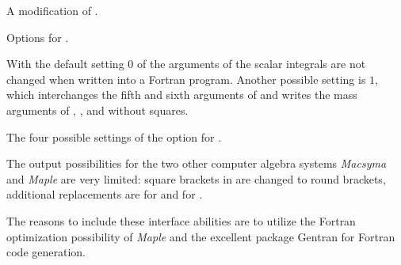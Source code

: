  {A modification of .}

 {Options for .} 

With the default setting $0$ of  the arguments of the 
scalar integrals are not changed when written into a Fortran program.
Another possible setting is $1$, which  interchanges the fifth and sixth arguments
of  and writes the mass arguments of , ,  and 
 without squares.

 {The four possible settings of the option  for .}

The output possibilities for the two other computer algebra systems 
{\it Macsyma} and {\it Maple} are very limited: square brackets in 
\mma are changed to round brackets,  additional replacements are for
  and for 
 \mb{\{ = $\rightarrow$ := \}}.

The reasons to include these interface abilities are to utilize the 
Fortran optimization possibility of {\it Maple}
and the excellent package Gentran for Fortran code generation.


